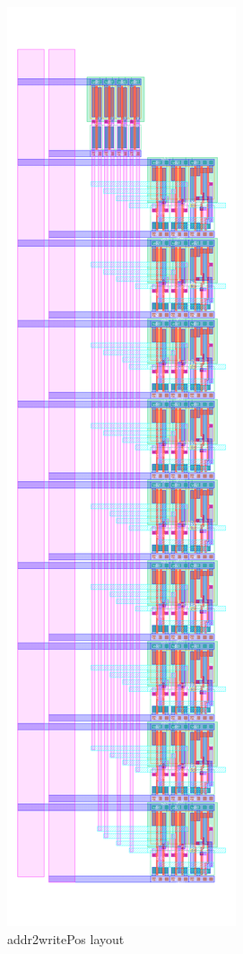 \documentclass[]{article}
\begin{document}
\begin{figure}[H]
\centering
\includegraphics[height=.8\paperheight]{addr2writePos-layout}
\caption{addr2writePos layout}
\label{fig:addr2writePos-layout}
\end{figure}
\end{document}

